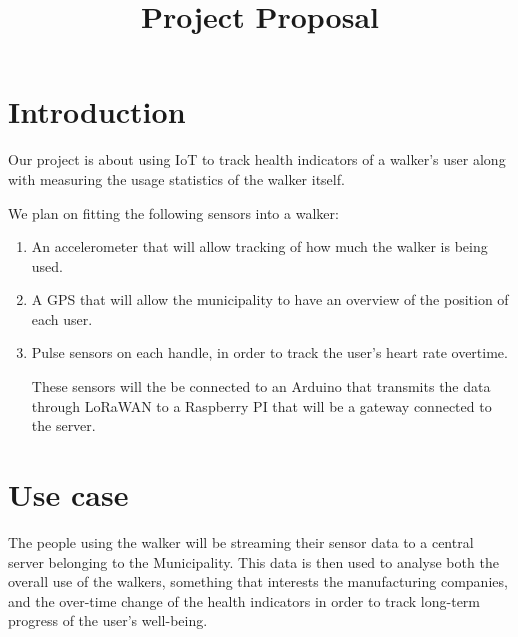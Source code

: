 \documentclass[conference]{IEEEtran}
\begin{document}
\title{Project Proposal}

\author{
\and
{}
\and
{}
}

\maketitle

\section{Introduction}
Our project is about using IoT to track health indicators of a walker's user along with measuring the usage statistics of the walker itself.

We plan on fitting the following sensors into a walker:
\begin{enumerate}
	\item An accelerometer that will allow tracking of how much the walker is being used.
	\item A GPS that will allow the municipality to have an overview of the position of each user.
	\item Pulse sensors on each handle, in order to track the user's heart rate overtime.
	
These sensors will the be connected to an Arduino that transmits the data through LoRaWAN to a Raspberry PI that will be a gateway connected to the server.
\end{enumerate}	

 	

\section{Use case}
	The people using the walker will be streaming their sensor data to a central server belonging to the Municipality. This data is then used to analyse both the overall use of the walkers, something that interests the manufacturing companies, and the over-time change of the health indicators in order to track long-term progress of the user's well-being.
\end{document}
